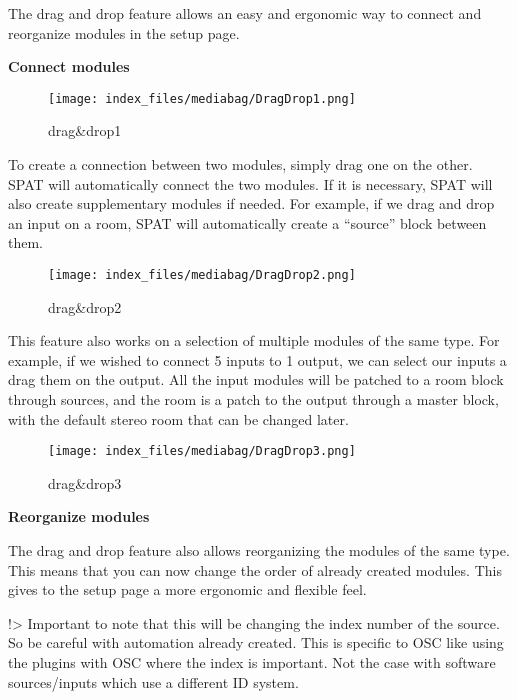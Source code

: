 \documentclass[
  letterpaper,
  DIV=11,
  numbers=noendperiod]{scrreport}
\begin{document}
The drag and drop feature allows an easy and ergonomic way to connect
and reorganize modules in the setup page.

\textbf{Connect modules}

\begin{figure}

{\centering \texttt{[image: index\_files/mediabag/DragDrop1.png]}

}

\caption{drag\&drop1}

\end{figure}

To create a connection between two modules, simply drag one on the
other. SPAT will automatically connect the two modules. If it is
necessary, SPAT will also create supplementary modules if needed. For
example, if we drag and drop an input on a room, SPAT will automatically
create a ``source'' block between them.

\begin{figure}

{\centering \texttt{[image: index\_files/mediabag/DragDrop2.png]}

}

\caption{drag\&drop2}

\end{figure}

This feature also works on a selection of multiple modules of the same
type. For example, if we wished to connect 5 inputs to 1 output, we can
select our inputs a drag them on the output. All the input modules will
be patched to a room block through sources, and the room is a patch to
the output through a master block, with the default stereo room that can
be changed later.

\begin{figure}

{\centering \texttt{[image: index\_files/mediabag/DragDrop3.png]}

}

\caption{drag\&drop3}

\end{figure}

\textbf{Reorganize modules}

The drag and drop feature also allows reorganizing the modules of the
same type. This means that you can now change the order of already
created modules. This gives to the setup page a more ergonomic and
flexible feel.

!\textgreater{} Important to note that this will be changing the index
number of the source. So be careful with automation already created.
This is specific to OSC like using the plugins with OSC where the index
is important. Not the case with software sources/inputs which use a
different ID system.
\end{document}
